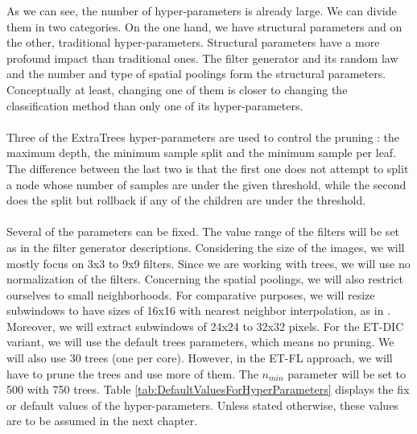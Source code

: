\documentclass[a4paper]{report}
\newlength{\larg}
\begin{document}
	As we can see, the number of hyper-parameters is already large. We can divide them in two categories. On the one hand, we have structural parameters and on the other, traditional hyper-parameters. Structural parameters have a more profound impact than traditional ones. The filter generator and its random law and the number and type of spatial poolings form the structural parameters. Conceptually at least, changing one of them is closer to changing the classification method than only one of its hyper-parameters.
	\paragraph{}
	Three of the ExtraTrees hyper-parameters are used to control the pruning : the maximum depth, the minimum sample split and the minimum sample per leaf. The difference between the last two is that the first one does not attempt to split a node whose number of samples are under the given threshold, while the second does the split but rollback if any of the children are under the threshold. 
	\paragraph{}
	Several of the parameters can be fixed. The value range of the filters will be set as in the filter generator descriptions. Considering the size of the images, we will mostly focus on 3x3 to 9x9 filters. Since we are working with trees, we will use no normalization of the filters. Concerning the spatial poolings, we will also restrict ourselves to small neighborhoods. For comparative purposes, we will resize subwindows to have sizes of 16x16 with nearest neighbor interpolation, as in \cite{}. Moreover, we will extract subwindows of 24x24 to 32x32 pixels. For the ET-DIC variant, we will use the default trees parameters, which means no pruning. We will also use 30 trees (one per core). However, in the ET-FL approach, we will have to prune the trees and use more of them. The $n_{min}$ parameter will be set to 500 with 750 trees. Table \ref{tab:DefaultValuesForHyperParameters} displays the fix or default values of the hyper-parameters. Unless stated otherwise, these values are to be assumed in the next chapter.
	
\end{document}
